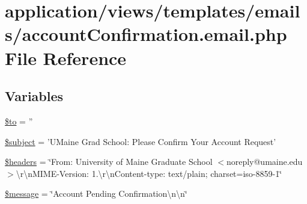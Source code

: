 \hypertarget{account_confirmation_8email_8php}{\section{application/views/templates/emails/account\-Confirmation.email.\-php File Reference}
\label{account_confirmation_8email_8php}
}
\subsection*{Variables}
\begin{DoxyCompactItemize}
\item 
\hyperlink{account_confirmation_8email_8php_ac19f839b525d6d99d063fe56bf2a6d3b}{\$to} = ''
\item 
\hyperlink{account_confirmation_8email_8php_afea90503726cd5ad2eb80baf0b6d217d}{\$subject} = 'U\-Maine Grad School\-: Please Confirm Your Account Request'
\item 
\hyperlink{account_confirmation_8email_8php_a52500036ee807241b8b4b7e2367c49ef}{\$headers} = \char`\"{}From\-: University of Maine Graduate School $<$noreply@umaine.\-edu$>$\textbackslash{}r\textbackslash{}n\-M\-I\-M\-E-\/Version\-: 1.\textbackslash{}r\textbackslash{}n\-Content-\/type\-: text/plain; charset=iso-\/8859-\/1\char`\"{}
\item 
\hyperlink{account_confirmation_8email_8php_abf17cb2dba2ed17cb28aa5f37deb5293}{\$message} = \char`\"{}Account Pending Confirmation\textbackslash{}n\textbackslash{}n\char`\"{}
\end{DoxyCompactItemize}


